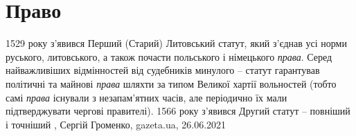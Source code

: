  
 
 
 
 
\chapter{Право}
\label{sec:slova.pravo}

1529 року з'явився Перший (Старий) Литовський статут, який з'єднав усі норми
руського, литовського, а також почасти польського і німецького \emph{права}. Серед
найважливіших відмінностей від судебників минулого – статут гарантував
політичні та майнові \emph{права} шляхти за типом Великої хартії вольностей (тобто
самі \emph{права} існували з незапам'ятних часів, але періодично їх мали
підтверджувати чергові правителі). 1566 року з'явився Другий статут – повніший
і точніший
, 
Сергій Громенко, gazeta.ua, 26.06.2021
